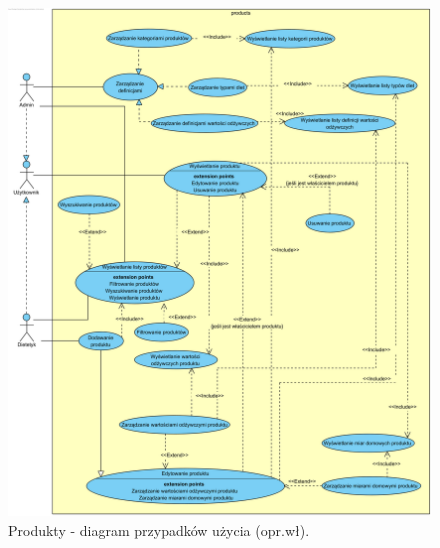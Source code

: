 \begin{minipage}{\textwidth}
    \begin{figure}[H]
        \centering\includegraphics[scale=0.55]{../uml/use_case_diagrams/products.png}
        \caption{Produkty - diagram przypadków użycia (opr.wł).}\label{rysunek:use-case-diagram-products}
    \end{figure}
\end{minipage}

